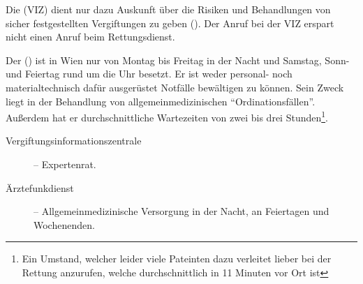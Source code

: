 
{
Die
 (VIZ) dient nur dazu
Auskunft über die Risiken und Behandlungen von sicher festgestellten Vergiftungen zu
geben (). Der Anruf bei der VIZ erspart
nicht einen Anruf beim Rettungsdienst.

Der  ()
ist in Wien nur von Montag bis Freitag in der Nacht und Samstag, Sonn- und
Feiertag rund um die Uhr besetzt. Er
ist weder personal- noch materialtechnisch dafür ausgerüstet
Notfälle bewältigen zu können. Sein Zweck liegt in der
Behandlung von allgemeinmedizinischen "`Ordinationsfällen"'. Außerdem hat er durchschnittliche
Wartezeiten von zwei bis drei Stunden\footnote{Ein Umstand,
welcher leider viele Pateinten dazu verleitet lieber bei der Rettung anzurufen, welche
durchschnittlich in 11 Minuten vor Ort ist}. 
}{
\begin{description}
    \item[Vergiftungsinformationszentrale]  --
    Expertenrat.
    \item[Ärztefunkdienst]  -- Allgemeinmedizinische Versorgung in
    der Nacht, an Feiertagen und Wochenenden.
\end{description}
}{}{}{}




